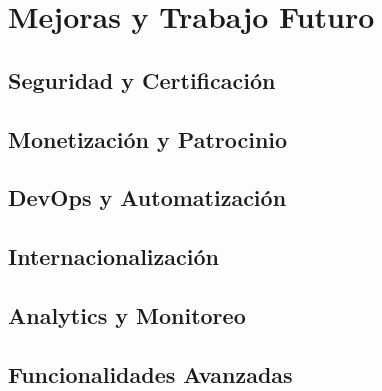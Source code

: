 \chapter{Mejoras y Trabajo Futuro}
\section{Seguridad y Certificación}
\section{Monetización y Patrocinio}
\section{DevOps y Automatización}
\section{Internacionalización}
\section{Analytics y Monitoreo}
\section{Funcionalidades Avanzadas}
